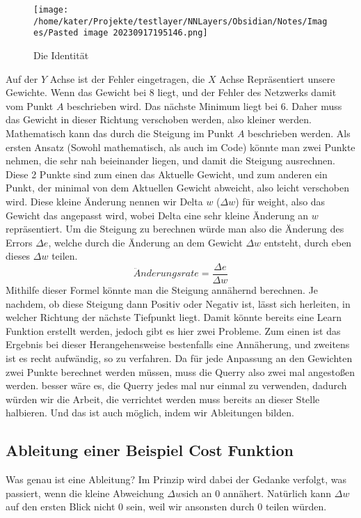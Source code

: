 \documentclass[12pt]{article}
\begin{document}
\begin{figure}[H]
\centering
\texttt{[image: /home/kater/Projekte/testlayer/NNLayers/Obsidian/Notes/Images/Pasted image 20230917195146.png]}
\caption{Die Identität}
\label{Was kommt hier rein?}\end{figure}Auf der $Y$ Achse ist der Fehler eingetragen, die $X$ Achse Repräsentiert unsere Gewichte. Wenn das Gewicht bei 8 liegt, und der Fehler des Netzwerks damit vom Punkt $A$ beschrieben wird. Das nächste Minimum liegt bei 6. Daher muss das Gewicht in dieser Richtung verschoben werden, also kleiner werden. 
Mathematisch kann das durch die Steigung im Punkt $A$ beschrieben werden. Als ersten Ansatz (Sowohl mathematisch, als auch im Code) könnte man zwei Punkte nehmen, die sehr nah beieinander liegen, und damit die Steigung ausrechnen. Diese 2 Punkte sind zum einen das Aktuelle Gewicht, und zum anderen ein Punkt, der minimal von dem Aktuellen Gewicht abweicht, also leicht verschoben wird.
Diese kleine Änderung nennen wir Delta $w$ ($\Delta w$) für weight, also das Gewicht das angepasst wird, wobei Delta eine sehr kleine Änderung an $w$ repräsentiert.
Um die Steigung zu berechnen würde man also die Änderung des Errors $\Delta e$, welche durch die Änderung an dem Gewicht $\Delta w$ entsteht, durch eben dieses $\Delta w$ teilen. $$\ddot{A}nderungsrate = \frac{\Delta e}{\Delta w}$$
Mithilfe dieser Formel könnte man die Steigung annähernd berechnen. Je nachdem, ob diese Steigung dann Positiv oder Negativ ist, lässt sich herleiten, in welcher Richtung der nächste Tiefpunkt liegt. Damit könnte bereits eine Learn Funktion erstellt werden, jedoch gibt es hier zwei Probleme.
Zum einen ist das Ergebnis bei dieser Herangehensweise bestenfalls eine Annäherung, und zweitens ist es recht aufwändig, so zu verfahren. Da für jede Anpassung an den Gewichten zwei Punkte berechnet werden müssen, muss die Querry also zwei mal angestoßen werden. besser wäre es, die Querry jedes mal nur einmal zu verwenden, dadurch würden wir die Arbeit, die verrichtet werden muss bereits an dieser Stelle halbieren. Und das ist auch möglich, indem wir Ableitungen bilden.\subsection{ Ableitung einer Beispiel Cost Funktion}Was genau ist eine Ableitung? Im Prinzip wird dabei der Gedanke verfolgt, was passiert, wenn die kleine Abweichung $\Delta w$sich an 0 annähert. Natürlich kann $\Delta w$auf den ersten Blick nicht 0 sein, weil wir ansonsten durch 0 teilen würden. 
\end{document}

